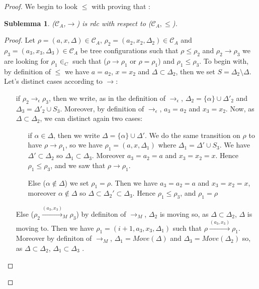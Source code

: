 \documentclass[a4paper,10pt]{report}
\newtheorem{slm}{Sublemma}[lm]
\newcommand{\C}{\mathcal{C}_{A}}
\begin{document}
\begin{proof}
  We begin to look $\leq$ with proving that :
  \begin{slm}
    ($\C$,$\rightarrow$) is rdc with respect to ($\C,\leq$).
  \end{slm}
   \begin{proof}
   Let $\rho = (a,x,\Delta) \in \C$, $\rho_2 = (a_2,x_2,\Delta_2) \in \C$ and $\rho_3 = (a_3,x_3,\Delta_3) \in \C$ be tree configurations 
   such that $\rho \leq \rho_2$ and $\rho_2 \rightarrow \rho_3$ we are looking for $\rho_1 \in _C$ such that ($\rho \rightarrow \rho_1$ or $\rho = \rho_1$) and $\rho_1 \leq \rho_3$.
   To begin with, by definition of $\leq$ we have $a = a_2$, $x= x_2$ and $\Delta \subset \Delta_2$, then we set $S = \Delta_2 \setminus \Delta$. Let's distinct cases according to $\rightarrow$: 
   \begin{itemize}
    \item [if $\rho_2 \rightarrow_{\epsilon} \rho_3$,] 
    then we write, as in the definition of $\rightarrow_{\epsilon}$,  $\Delta_2 = \{\alpha \} \cup \Delta'_2$ and $\Delta_3 = \Delta'_2 \cup S_3$.
    Moreover, by definition of $\rightarrow_{\epsilon}$, $a_3 = a_2$ and $x_3 = x_2$.
    Now, as $\Delta \subset \Delta_2$, we can distinct again two cases:
      \begin{itemize}
	\item [if $\alpha \in \Delta$,] then we write $\Delta = \{\alpha \} \cup \Delta'$.  
	We do the same transition on $\rho$ to have $\rho \rightarrow \rho_1$, so we have $\rho_1 = (a,x,\Delta_1)$ where $\Delta_1 = \Delta' \cup S_3$. 
	We have $\Delta' \subset \Delta_2$ so $\Delta_1 \subset \Delta_3$.
	Moreover $a_3= a_2 = a$ and $x_3 = x_2 = x$.
	Hence $\rho_1 \leq \rho_3$, and we saw that $\rho \rightarrow \rho_1$.
	\item [Else ($\alpha \notin \Delta$)] we set $\rho_1 = \rho$. Then we have $a_3= a_2 = a$ and $x_3 = x_2 = x$, moreover $\alpha \notin \Delta $ so $\Delta \subset \Delta_2' \subset \Delta_3$.
	Hence $\rho_1 \leq \rho_3$, and $\rho_1 = \rho$ 
      \end{itemize}
     \item [Else ($\rho_2 \xrightarrow{(a_3,x_3)}_{M} \rho_3$)] by definiton of $\rightarrow_{M}$, $\Delta_2$ is moving so, as $\Delta \subset \Delta_2$, $\Delta$ is moving to.
     Then we have $\rho_1 = (i+1,a_3,x_3,\Delta_1)$ such that $\rho \xrightarrow{(a_3,x_3)} \rho_1$.
     Moreover by definiton of $\rightarrow_{M}$, $\Delta_1 = Move(\Delta)$ and $\Delta_3 = Move(\Delta_2)$ so, as $\Delta \subset \Delta_2$, $\Delta_1 \subset \Delta_3$ . 

\end{itemize}
\end{proof}
\end{proof}
\end{document}
